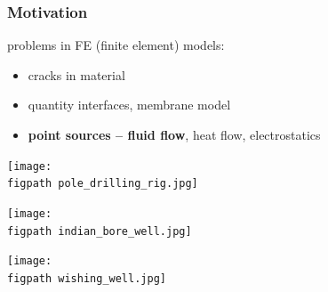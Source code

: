 \documentclass[10pt, xcolor=dvipsnames]{beamer} %
\newcommand{\figpath}{../graphics/}
\begin{document}
\begin{frame}
  \frametitle{Motivation}
  problems in FE (finite element) models:
    \begin{itemize}
      \item cracks in material
      \item quantity interfaces, membrane model
      \item {\bf point sources -- fluid flow}, heat flow, electrostatics
    \end{itemize}
  
  \pause
  \hspace{-3pt}
  \begin{minipage}{0.32\linewidth}
    \texttt{[image: \\figpath pole\_drilling\_rig.jpg]}
  \end{minipage}
  \begin{minipage}{0.32\linewidth}
    \texttt{[image: \\figpath indian\_bore\_well.jpg]}
  \end{minipage}
  \begin{minipage}{0.32\linewidth}
    \texttt{[image: \\figpath wishing\_well.jpg]}
  \end{minipage}
\end{frame}
\end{document}
